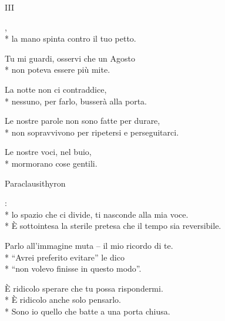 \documentclass[12pt]{book}
\begin{document}
\begin{poem}{III}{}

\settowidth{\versewidth}{non meno è ciò che meriti.}
\begin{changemargin}{-1cm}{-2cm} 
\begin{altverse}
\quad \qquad {},\\*
la mano spinta contro il tuo petto.
\end{altverse}


\begin{altverse}
Tu mi guardi, osservi che un Agosto\\*
non poteva essere più mite.
\end{altverse}


\begin{altverse}
La notte non ci contraddice,\\*
nessuno, per farlo, busserà alla porta.
\end{altverse}


\begin{altverse}
Le nostre parole non sono fatte per durare,\\*
non sopravvivono per ripetersi e perseguitarci.
\end{altverse}


\begin{altverse}
Le nostre voci, nel buio,\\*
mormorano cose gentili.
\end{altverse}
\end{changemargin}
\end{poem}

\begin{poem}{Paraclausithyron}{}

\settowidth{\versewidth}{non meno è ciò che meriti.}
\begin{changemargin}{-2cm}{-3cm} 
\begin{altverse}
: \\*
lo spazio che ci divide, ti nasconde alla mia voce. \\*
È sottointesa la sterile pretesa che il tempo sia reversibile.
\end{altverse}

\begin{altverse}
Parlo all’immagine muta – il mio ricordo di te. \\*
“Avrei preferito evitare” le dico \\*
“non volevo finisse in questo modo”.
\end{altverse}

\begin{altverse}
È ridicolo sperare che tu possa rispondermi. \\*
È ridicolo anche solo pensarlo. \\*
Sono io quello che batte a una porta chiusa.
\end{altverse}

\end{changemargin}
\end{poem}
\end{document}
